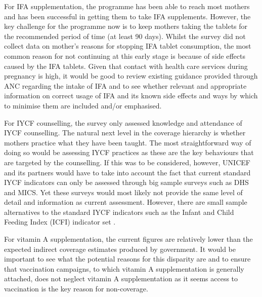 \documentclass[12pt,a4paper]{article}
\begin{document}
For IFA supplementation, the programme has been able to reach most mothers and has been successful in getting them to take IFA supplements. However, the key challenge for the programme now is to keep mothers taking the tablets for the recommended period of time (at least 90 days). Whilst the survey did not collect data on mother's reasons for stopping IFA tablet consumption, the most common reason for not continuing at this early stage is because of side effects caused by the IFA tablets. Given that contact with health care services during pregnancy is high, it would be good to review existing guidance provided through ANC regarding the intake of IFA and to see whether relevant and appropriate information on correct usage of IFA and its known side effects and ways by which to minimise them are included and/or emphasised.

For IYCF counselling, the survey only assessed knowledge and attendance of IYCF counselling. The natural next level in the coverage hierarchy is whether mothers practice what they have been taught. The most straightforward way of doing so would be assessing IYCF practices as these are the key behaviours that are targeted by the counselling. If this was to be considered, however, UNICEF and its partners would have to take into account the fact that current standard IYCF indicators can only be assessed through big sample surveys such as DHS and MICS. Yet these surveys would most likely not provide the same level of detail and information as current assessment. However, there are small sample alternatives to the standard IYCF indicators such as the Infant and Child Feeding Index (ICFI) indicator set \citep{Guevarra:2016uw}.

For vitamin A supplementation, the current figures are relatively lower than the expected indirect coverage estimates produced by government. It would be important to see what the potential reasons for this disparity are and to ensure that vaccination campaigns, to which vitamin A supplementation is generally attached, does not neglect vitamin A supplementation as it seems access to vaccination is the key reason for non-coverage.
\end{document}
